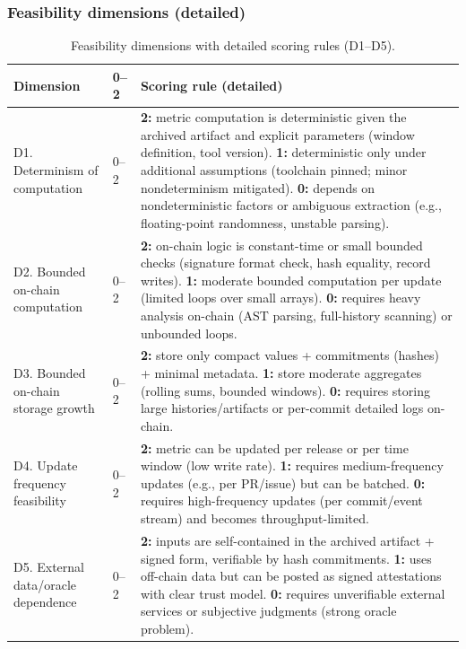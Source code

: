 \subsubsection{Feasibility dimensions (detailed)}
\label{sec:feasibility_dimensions_detailed}

\begin{table}[H]
\centering
\scriptsize
\renewcommand{\arraystretch}{1.14}
\begin{tabularx}{\textwidth}{p{2.8cm}p{0.8cm}X}
\toprule
\textbf{Dimension} & \textbf{0--2} & \textbf{Scoring rule (detailed)} \\
\midrule
D1. Determinism of computation & 0--2 &
\textbf{2:} metric computation is deterministic given the archived artifact and explicit parameters (window definition, tool version).
\textbf{1:} deterministic only under additional assumptions (toolchain pinned; minor nondeterminism mitigated).
\textbf{0:} depends on nondeterministic factors or ambiguous extraction (e.g., floating-point randomness, unstable parsing). \\

D2. Bounded on-chain computation & 0--2 &
\textbf{2:} on-chain logic is constant-time or small bounded checks (signature format check, hash equality, record writes).
\textbf{1:} moderate bounded computation per update (limited loops over small arrays).
\textbf{0:} requires heavy analysis on-chain (AST parsing, full-history scanning) or unbounded loops. \\

D3. Bounded on-chain storage growth & 0--2 &
\textbf{2:} store only compact values + commitments (hashes) + minimal metadata.
\textbf{1:} store moderate aggregates (rolling sums, bounded windows).
\textbf{0:} requires storing large histories/artifacts or per-commit detailed logs on-chain. \\

D4. Update frequency feasibility & 0--2 &
\textbf{2:} metric can be updated per release or per time window (low write rate).
\textbf{1:} requires medium-frequency updates (e.g., per PR/issue) but can be batched.
\textbf{0:} requires high-frequency updates (per commit/event stream) and becomes throughput-limited. \\

D5. External data/oracle dependence & 0--2 &
\textbf{2:} inputs are self-contained in the archived artifact + signed form, verifiable by hash commitments.
\textbf{1:} uses off-chain data but can be posted as signed attestations with clear trust model.
\textbf{0:} requires unverifiable external services or subjective judgments (strong oracle problem). \\
\bottomrule
\end{tabularx}
\caption{Feasibility dimensions with detailed scoring rules (D1--D5).}
\label{tab:feasibility_dimensions}
\end{table}


